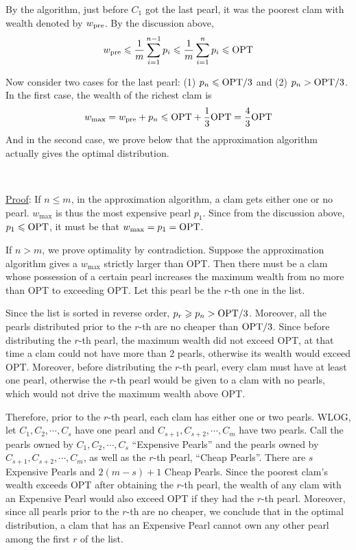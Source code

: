 \documentclass{article}
\begin{document}
By the algorithm, just before $C_1$ got the last pearl, it was the poorest clam with wealth denoted by $w_{\textup{pre}}$. By the discussion above,
\begin{equation*}
w_{\textup{pre}}\leqslant\frac{1}{m}\sum_{i=1}^{n-1}p_i\leqslant\frac{1}{m}\sum_{i=1}^np_i\leqslant\textup{OPT}
\end{equation*}

Now consider two cases for the last pearl: (1) $p_n\leqslant\textup{OPT}/3$ and (2) $p_n>\textup{OPT}/3$. In the first case, the wealth of the richest clam is
\begin{equation*}
w_{\max}=w_{\textup{pre}}+p_n\leqslant\textup{OPT}+\frac{1}{3}\textup{OPT}=\frac{4}{3}\textup{OPT}
\end{equation*}
And in the second case, we prove below that the approximation algorithm actually gives the optimal distribution.

~

\noindent\underline{Proof}:
If $n\leqslant m$, in the approximation algorithm, a clam gets either one or no pearl. $w_{\max}$ is thus the most expensive pearl $p_1$. Since from the discussion above, $p_1\leqslant\textup{OPT}$, it must be that $w_{\max}=p_1=\textup{OPT}$.

If $n>m$, we prove optimality by contradiction. Suppose the approximation algorithm gives a $w_{\max}$ strictly larger than OPT. Then there must be a clam whose possession of a certain pearl increases the maximum wealth from no more than OPT to exceeding OPT. Let this pearl be the $r$-th one in the list.

Since the list is sorted in reverse order, $p_r\geqslant p_n>\textup{OPT}/3$. Moreover, all the pearls distributed prior to the $r$-th are no cheaper than $\textup{OPT}/3$. Since before distributing the $r$-th pearl, the maximum wealth did not exceed OPT, at that time a clam could not have more than 2 pearls, otherwise its wealth would exceed OPT. Moreover, before distributing the $r$-th pearl, every clam must have at least one pearl, otherwise the $r$-th pearl would be given to a clam with no pearls, which would not drive the maximum wealth above OPT.

Therefore, prior to the $r$-th pearl, each clam has either one or two pearls. WLOG, let $C_1,C_2,\cdots,C_s$ have one pearl and $C_{s+1},C_{s+2},\cdots,C_m$ have two pearls. Call the pearls owned by $C_1,C_2,\cdots,C_s$ ``Expensive Pearls'' and the pearls owned by $C_{s+1},C_{s+2},\cdots,C_m$, as well as the $r$-th pearl, ``Cheap Pearls''. There are $s$ Expensive Pearls and $2(m-s)+1$ Cheap Pearls. Since the poorest clam's wealth exceeds OPT after obtaining the $r$-th pearl, the wealth of any clam with an Expensive Pearl would also exceed OPT if they had the $r$-th pearl. Moreover, since all pearls prior to the $r$-th are no cheaper, we conclude that in the optimal distribution, a clam that has an Expensive Pearl cannot own any other pearl among the first $r$ of the list.
\end{document}

